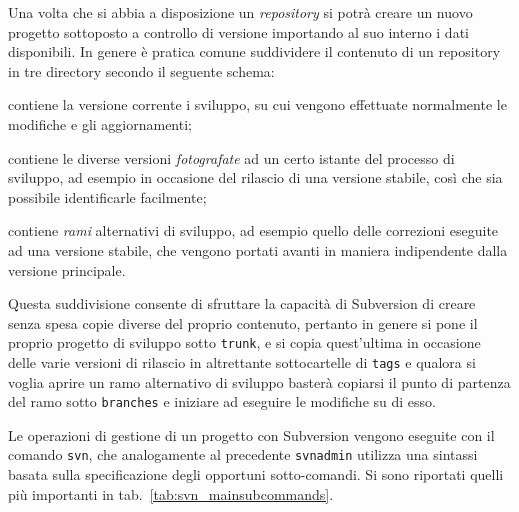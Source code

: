 Una volta che si abbia a disposizione un \textit{repository} si potrà creare
un nuovo progetto sottoposto a controllo di versione importando al suo interno
i dati disponibili. In genere è pratica comune suddividere il contenuto di un
repository in tre directory secondo il seguente schema:
\begin{basedescript}{\desclabelwidth{2.7cm}\desclabelstyle{\nextlinelabel}}
\item[\texttt{trunk}] contiene la versione corrente i sviluppo, su cui vengono
  effettuate normalmente le modifiche e gli aggiornamenti;
\item[\texttt{tags}] contiene le diverse versioni \textsl{fotografate} ad un
  certo istante del processo di sviluppo, ad esempio in occasione del rilascio
  di una versione stabile, così che sia possibile identificarle facilmente;
\item[\texttt{branches}] contiene \textsl{rami} alternativi di sviluppo, ad
  esempio quello delle correzioni eseguite ad una versione stabile, che
  vengono portati avanti in maniera indipendente dalla versione principale.
\end{basedescript}

Questa suddivisione consente di sfruttare la capacità di Subversion di creare
senza spesa copie diverse del proprio contenuto, pertanto in genere si pone il
proprio progetto di sviluppo sotto \texttt{trunk}, e si copia quest'ultima in
occasione delle varie versioni di rilascio in altrettante sottocartelle di
\texttt{tags} e qualora si voglia aprire un ramo alternativo di sviluppo
basterà copiarsi il punto di partenza del ramo sotto \texttt{branches} e
iniziare ad eseguire le modifiche su di esso.

Le operazioni di gestione di un progetto con Subversion vengono eseguite con
il comando \texttt{svn}, che analogamente al precedente \texttt{svnadmin}
utilizza una sintassi basata sulla specificazione degli opportuni
sotto-comandi. Si sono riportati quelli più importanti in
tab.~\ref{tab:svn_mainsubcommands}. 

